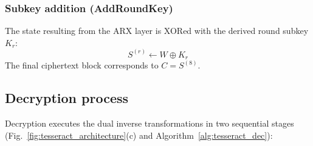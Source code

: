 \documentclass[review,12pt]{elsarticle}
\begin{document}
\subsubsection{Subkey addition (AddRoundKey)}
The state resulting from the ARX layer is XORed with the derived round subkey $K_r$:
\begin{equation}
    S^{(r)} \leftarrow W \oplus K_r
\end{equation}
The final ciphertext block corresponds to $C = S^{(8)}$.

\subsection{Decryption process}
Decryption executes the dual inverse transformations in two sequential stages (Fig.~\ref{fig:tesseract_architecture}(c) and Algorithm~\ref{alg:tesseract_dec}):
\end{document}
